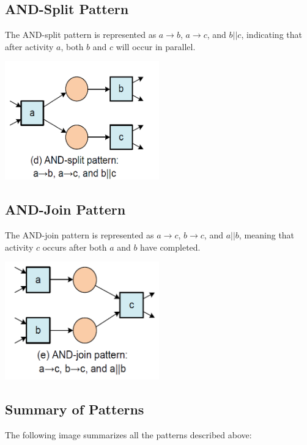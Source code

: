     \subsection{AND-Split Pattern}
    The AND-split pattern is represented as \(a \rightarrow b\), \(a \rightarrow c\), and \(b || c\), indicating that after activity \(a\), both \(b\) and \(c\) will occur in parallel.
    
    \begin{center}
        \includegraphics[width=0.5\textwidth]{capitolo 5/5 and split pattern.png}
    \end{center}
    
    \subsection{AND-Join Pattern}
    The AND-join pattern is represented as \(a \rightarrow c\), \(b \rightarrow c\), and \(a || b\), meaning that activity \(c\) occurs after both \(a\) and \(b\) have completed.
    
    \begin{center}
        \includegraphics[width=0.5\textwidth]{capitolo 5/5 and join pattern.png}
    \end{center}
    
    \subsection{Summary of Patterns}
    The following image summarizes all the patterns described above:
    
